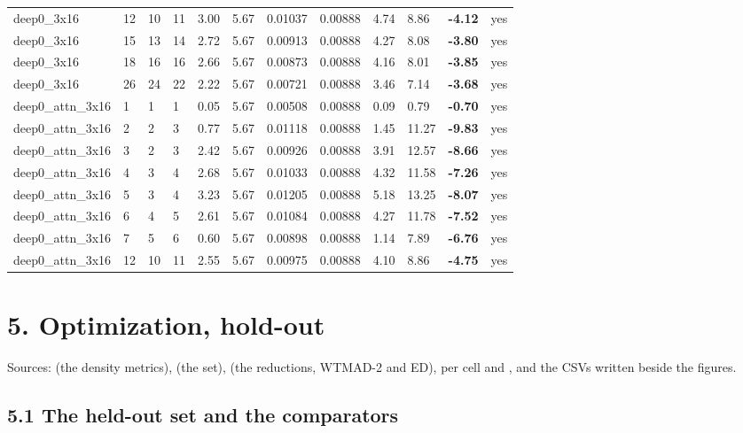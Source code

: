 \documentclass[10pt,a4paper]{article}
\begin{document}
\begin{landscape}
\begin{scriptsize}
\begin{longtable}{llllllllllll}
deep0\_3x16 & 12 & 10 & 11 & 3.00 & 5.67 & 0.01037 & 0.00888 & 4.74 & 8.86 & \textbf{-4.12} & yes \\
deep0\_3x16 & 15 & 13 & 14 & 2.72 & 5.67 & 0.00913 & 0.00888 & 4.27 & 8.08 & \textbf{-3.80} & yes \\
deep0\_3x16 & 18 & 16 & 16 & 2.66 & 5.67 & 0.00873 & 0.00888 & 4.16 & 8.01 & \textbf{-3.85} & yes \\
deep0\_3x16 & 26 & 24 & 22 & 2.22 & 5.67 & 0.00721 & 0.00888 & 3.46 & 7.14 & \textbf{-3.68} & yes \\
deep0\_attn\_3x16 & 1 & 1 & 1 & 0.05 & 5.67 & 0.00508 & 0.00888 & 0.09 & 0.79 & \textbf{-0.70} & yes \\
deep0\_attn\_3x16 & 2 & 2 & 3 & 0.77 & 5.67 & 0.01118 & 0.00888 & 1.45 & 11.27 & \textbf{-9.83} & yes \\
deep0\_attn\_3x16 & 3 & 2 & 3 & 2.42 & 5.67 & 0.00926 & 0.00888 & 3.91 & 12.57 & \textbf{-8.66} & yes \\
deep0\_attn\_3x16 & 4 & 3 & 4 & 2.68 & 5.67 & 0.01033 & 0.00888 & 4.32 & 11.58 & \textbf{-7.26} & yes \\
deep0\_attn\_3x16 & 5 & 3 & 4 & 3.23 & 5.67 & 0.01205 & 0.00888 & 5.18 & 13.25 & \textbf{-8.07} & yes \\
deep0\_attn\_3x16 & 6 & 4 & 5 & 2.61 & 5.67 & 0.01084 & 0.00888 & 4.27 & 11.78 & \textbf{-7.52} & yes \\
deep0\_attn\_3x16 & 7 & 5 & 6 & 0.60 & 5.67 & 0.00898 & 0.00888 & 1.14 & 7.89 & \textbf{-6.76} & yes \\
deep0\_attn\_3x16 & 12 & 10 & 11 & 2.55 & 5.67 & 0.00975 & 0.00888 & 4.10 & 8.86 & \textbf{-4.75} & yes \\
\bottomrule \end{longtable}
\end{scriptsize}
\end{landscape}


\section*{5. Optimization, hold-out}

Sources:  (the density metrics),  (the set),  (the reductions, WTMAD-2 and ED), per cell  and , and the CSVs written beside the figures.

\subsection*{5.1 The held-out set and the comparators}
\end{document}
